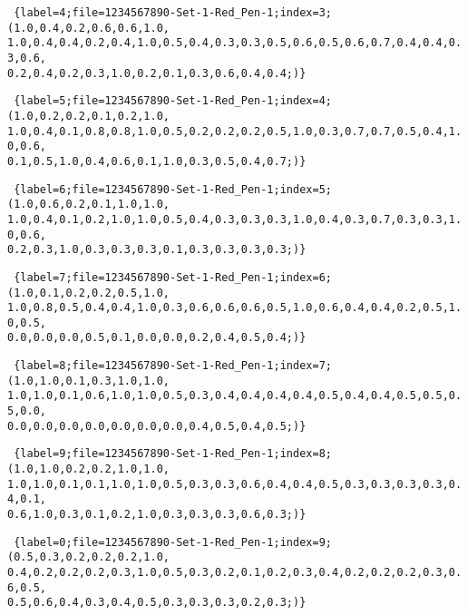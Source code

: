\texttt{
\{label=4;file=1234567890-Set-1-Red\_Pen-1;index=3;(1.0,0.4,0.2,0.6,0.6,1.0,\\
1.0,0.4,0.4,0.2,0.4,1.0,0.5,0.4,0.3,0.3,0.5,0.6,0.5,0.6,0.7,0.4,0.4,0.3,0.6,\\
0.2,0.4,0.2,0.3,1.0,0.2,0.1,0.3,0.6,0.4,0.4;)\}\\
}

\texttt{
\{label=5;file=1234567890-Set-1-Red\_Pen-1;index=4;(1.0,0.2,0.2,0.1,0.2,1.0,\\
1.0,0.4,0.1,0.8,0.8,1.0,0.5,0.2,0.2,0.2,0.5,1.0,0.3,0.7,0.7,0.5,0.4,1.0,0.6,\\
0.1,0.5,1.0,0.4,0.6,0.1,1.0,0.3,0.5,0.4,0.7;)\}\\
}

\texttt{
\{label=6;file=1234567890-Set-1-Red\_Pen-1;index=5;(1.0,0.6,0.2,0.1,1.0,1.0,\\
1.0,0.4,0.1,0.2,1.0,1.0,0.5,0.4,0.3,0.3,0.3,1.0,0.4,0.3,0.7,0.3,0.3,1.0,0.6,\\
0.2,0.3,1.0,0.3,0.3,0.3,0.1,0.3,0.3,0.3,0.3;)\}\\
}

\texttt{
\{label=7;file=1234567890-Set-1-Red\_Pen-1;index=6;(1.0,0.1,0.2,0.2,0.5,1.0,\\
1.0,0.8,0.5,0.4,0.4,1.0,0.3,0.6,0.6,0.6,0.5,1.0,0.6,0.4,0.4,0.2,0.5,1.0,0.5,\\
0.0,0.0,0.0,0.5,0.1,0.0,0.0,0.2,0.4,0.5,0.4;)\}\\
}

\texttt{
\{label=8;file=1234567890-Set-1-Red\_Pen-1;index=7;(1.0,1.0,0.1,0.3,1.0,1.0,\\
1.0,1.0,0.1,0.6,1.0,1.0,0.5,0.3,0.4,0.4,0.4,0.4,0.5,0.4,0.4,0.5,0.5,0.5,0.0,\\
0.0,0.0,0.0,0.0,0.0,0.0,0.0,0.4,0.5,0.4,0.5;)\}\\
}

\texttt{
\{label=9;file=1234567890-Set-1-Red\_Pen-1;index=8;(1.0,1.0,0.2,0.2,1.0,1.0,\\
1.0,1.0,0.1,0.1,1.0,1.0,0.5,0.3,0.3,0.6,0.4,0.4,0.5,0.3,0.3,0.3,0.3,0.4,0.1,\\
0.6,1.0,0.3,0.1,0.2,1.0,0.3,0.3,0.3,0.6,0.3;)\}\\
}

\texttt{
\{label=0;file=1234567890-Set-1-Red\_Pen-1;index=9;(0.5,0.3,0.2,0.2,0.2,1.0,\\
0.4,0.2,0.2,0.2,0.3,1.0,0.5,0.3,0.2,0.1,0.2,0.3,0.4,0.2,0.2,0.2,0.3,0.6,0.5,\\
0.5,0.6,0.4,0.3,0.4,0.5,0.3,0.3,0.3,0.2,0.3;)\}\\
}

